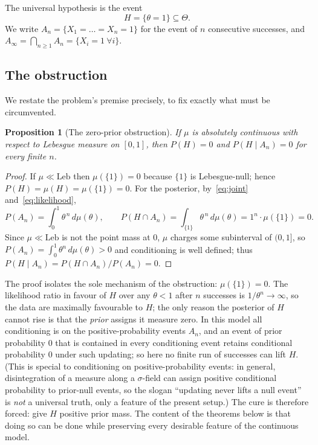 \documentclass{amsart}
\newtheorem{proposition}{Proposition}
\theoremstyle{definition}
\begin{document}
The universal hypothesis is the event
\begin{equation}\label{eq:H}
  H=\{\theta=1\}\subseteq\Theta .
\end{equation}
We write $A_n=\{X_1=\dots=X_n=1\}$ for the event of $n$ consecutive successes,
and $A_\infty=\bigcap_{n\ge1}A_n=\{X_i=1\ \forall i\}$.

\subsection{The obstruction}
We restate the problem's premise precisely, to fix exactly what must be
circumvented.

\begin{proposition}[The zero-prior obstruction]\label{prop:obstruction}
If $\mu$ is absolutely continuous with respect to Lebesgue measure on $[0,1]$,
then $P(H)=0$ and $P(H\mid A_n)=0$ for every finite $n$.
\end{proposition}

\begin{proof}
If $\mu\ll\mathrm{Leb}$ then $\mu(\{1\})=0$ because $\{1\}$ is Lebesgue-null;
hence $P(H)=\mu(H)=\mu(\{1\})=0$. For the posterior, by~\eqref{eq:joint}
and~\eqref{eq:likelihood},
\[
  P(A_n)=\int_0^1\theta^{\,n}\,d\mu(\theta),\qquad
  P(H\cap A_n)=\int_{\{1\}}\theta^{\,n}\,d\mu(\theta)=1^n\cdot\mu(\{1\})=0 .
\]
Since $\mu\ll\mathrm{Leb}$ is not the point mass at $0$, $\mu$ charges some
subinterval of $(0,1]$, so $P(A_n)=\int_0^1\theta^n\,d\mu(\theta)>0$ and
conditioning is well defined; thus
$P(H\mid A_n)=P(H\cap A_n)/P(A_n)=0$.
\end{proof}

The proof isolates the sole mechanism of the obstruction: $\mu(\{1\})=0$. The
likelihood ratio in favour of $H$ over any $\theta<1$ after $n$ successes is
$1/\theta^n\to\infty$, so the data are maximally favourable to $H$; the only
reason the posterior of $H$ cannot rise is that the \emph{prior} assigns it
measure zero. In this model all conditioning is on the
positive-probability events $A_n$, and an event of prior probability $0$ that is
contained in every conditioning event retains conditional probability $0$ under
such updating; so here no finite run of successes can lift $H$.
(This is special to conditioning on positive-probability events: in general,
disintegration of a measure along a $\sigma$-field can assign positive
conditional probability to prior-null events, so the slogan ``updating never
lifts a null event'' is \emph{not} a universal truth, only a feature of the
present setup.) The cure is therefore forced: give $H$ positive prior mass. The content
of the theorems below is that doing so can be done while preserving every
desirable feature of the continuous model.
\end{document}
